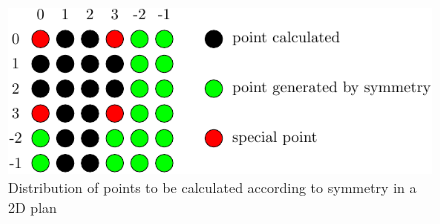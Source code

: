 \begin{figure}[th]
\begin{centering}
\includegraphics{_figure/test_lmn}
\par\end{centering}
\caption{Distribution of points to be calculated according to symmetry in a
2D plan\label{fig:points-symm}}
\end{figure}

